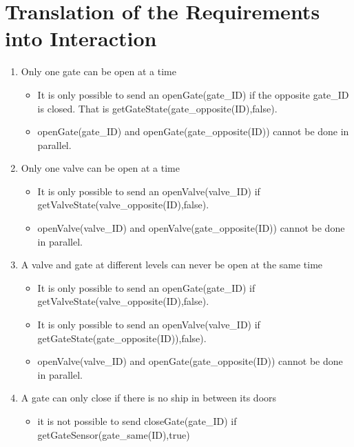 \section{Translation of the Requirements into Interaction}
\begin{enumerate}
	\item Only one gate can be open at a time
	
		\begin{itemize}
			\item It is only possible to send an openGate(gate\_ID) if the opposite gate\_ID is closed. That is getGateState(gate\_opposite(ID),false).
			\item openGate(gate\_ID) and openGate(gate\_opposite(ID)) cannot be done in parallel.
			
		\end{itemize}
	
	\item Only one valve can be open at a time
	
		\begin{itemize}
			\item It is only possible to send an openValve(valve\_ID) if getValveState(valve\_opposite(ID),false).
			\item openValve(valve\_ID) and openValve(gate\_opposite(ID)) cannot be done in parallel.
		\end{itemize}
	
	\item A valve and gate at different levels can never be open at the same time
		\begin{itemize}
			\item It is only possible to send an openGate(gate\_ID) if getValveState(valve\_opposite(ID),false).
			\item It is only possible to send an openValve(valve\_ID) if getGateState(gate\_opposite(ID)),false).
			\item openValve(valve\_ID) and openGate(gate\_opposite(ID)) cannot be done in parallel.
		\end{itemize}
	
	
	\item A gate can only close if there is no ship in between its doors
	\begin{itemize}
		\item it is not possible to send closeGate(gate\_ID) if getGateSensor(gate\_same(ID),true)
	\end{itemize}
	

\end{enumerate}
